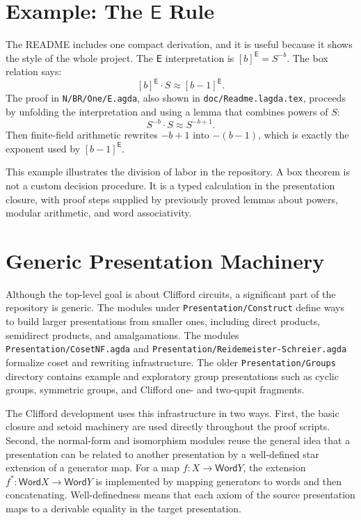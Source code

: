 \documentclass[sigplan,screen,review,anonymous]{acmart}
\newcommand{\Word}{\mathsf{Word}}
\newcommand{\EBox}{\mathsf{E}}
\newcommand{\file}[1]{\texttt{#1}}
\begin{document}
\section{Example: The \(\EBox\) Rule}

The README includes one compact derivation, and it is useful because
it shows the style of the whole project.  The \(\EBox\) interpretation
is \( [b]^\EBox = S^{-b}\).  The box relation says:
\[
  [b]^\EBox \cdot S \approx [b-1]^\EBox.
\]
The proof in \file{N/BR/One/E.agda}, also shown in
\file{doc/Readme.lagda.tex}, proceeds by unfolding the interpretation
and using a lemma that combines powers of \(S\):
\[
  S^{-b} \cdot S \approx S^{-b+1}.
\]
Then finite-field arithmetic rewrites \(-b+1\) into \(-(b-1)\), which
is exactly the exponent used by \([b-1]^\EBox\).

This example illustrates the division of labor in the repository.  A
box theorem is not a custom decision procedure.  It is a typed
calculation in the presentation closure, with proof steps supplied by
previously proved lemmas about powers, modular arithmetic, and word
associativity.

\section{Generic Presentation Machinery}

Although the top-level goal is about Clifford circuits, a significant
part of the repository is generic.  The modules under
\file{Presentation/Construct} define ways to build larger
presentations from smaller ones, including direct products,
semidirect products, and amalgamations.  The modules
\file{Presentation/CosetNF.agda} and
\file{Presentation/Reidemeister-Schreier.agda} formalize coset and
rewriting infrastructure.  The older \file{Presentation/Groups}
directory contains example and exploratory group presentations such
as cyclic groups, symmetric groups, and Clifford one- and two-qupit
fragments.

The Clifford development uses this infrastructure in two ways.  First,
the basic closure and setoid machinery are used directly throughout
the proof scripts.  Second, the normal-form and isomorphism modules
reuse the general idea that a presentation can be related to another
presentation by a well-defined star extension of a generator map.
For a map \(f : X \to \Word Y\), the extension \(f^\ast :
\Word X \to \Word Y\) is implemented by mapping generators to words
and then concatenating.  Well-definedness means that each axiom of
the source presentation maps to a derivable equality in the target
presentation.
\end{document}
